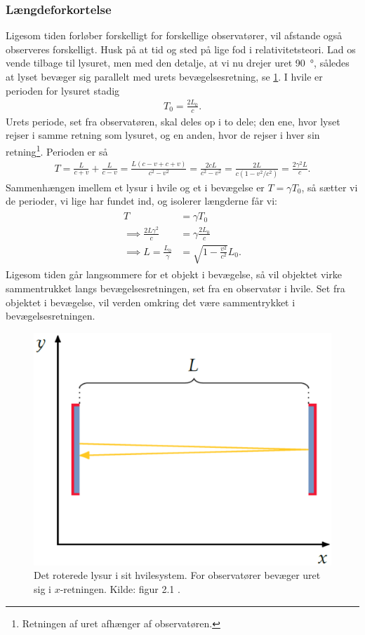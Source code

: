 \subsubsection{Længdeforkortelse} \label{rel:sec:Laengdeforkortelse}
Ligesom tiden forløber forskelligt for forskellige observatører, vil afstande også observeres forskelligt. Husk på at tid og sted på lige fod i relativitetsteori.
Lad os vende tilbage til lysuret, men med den detalje, at vi nu drejer uret \SI{90}{\degree}, således at lyset bevæger sig parallelt med urets bevægelsesretning, se \cref{rel:fig:roteret_lysur}. I hvile er perioden for lysuret stadig
%
\begin{align}
    T_0 = \frac{2L_0}{c}.
\end{align}
%
Urets periode, set fra observatøren, skal deles op i to dele; den ene, hvor lyset rejser i samme retning som lysuret, og en anden, hvor de rejser i hver sin retning\footnote{Retningen af uret afhænger af observatøren.}.
Perioden er så
%
\begin{align}
    T = \frac{L}{c+v}+\frac{L}{c-v} = \frac{L(c-v+c+v)}{c^2-v^2} = \frac{2cL}{c^2-v^2} = \frac{2L}{c(1-v^2/c^2)} = \frac{2\gamma^2 L}{c}.
\end{align}
%
Sammenhængen imellem et lysur i hvile og et i bevægelse er $T=\gamma T_0$, så sætter vi de perioder, vi lige har fundet ind, og isolerer længderne får vi:
%
\begin{align} \label{rel:eq:Laengdeforkortelse}
\begin{aligned}
    T & =\gamma T_0\\
    \implies \frac{2L\gamma^2}{c} &= \gamma\frac{2L_0}{c}\\
    \implies L = \frac{L_0}{\gamma} &= \sqrt{1-\frac{v^2}{c^2}}L_0.
\end{aligned}
\end{align}
%
Ligesom tiden går langsommere for et objekt i bevægelse, så vil objektet virke sammentrukket langs bevægelsesretningen, set fra en observatør i hvile. Set fra objektet i bevægelse, vil verden omkring det være sammentrykket i bevægelsesretningen.

\begin{figure}
    \centering
    \includegraphics[width = .5\columnwidth]{Rel/RelLorent/lysur.eps}
    \caption{Det roterede lysur i sit hvilesystem. For observatører bevæger uret sig i $x$-retningen. Kilde: figur 2.1 \cite{uggerhojSpecielRelativitetsteori2016}.}
    \label{rel:fig:roteret_lysur}
\end{figure}

